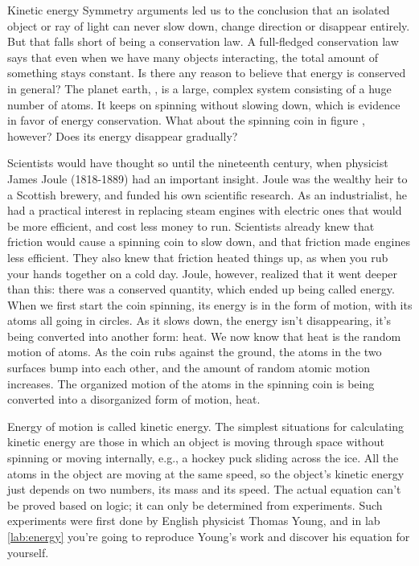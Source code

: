 \begin{envsubsection}{Kinetic energy}
Symmetry arguments led us to the conclusion that an isolated object or ray of light can never
slow down, change direction or disappear entirely. But that falls short of being a conservation
law. A full-fledged conservation law says that even when we have many objects interacting, the
total amount of something stays constant. Is there any reason to believe that energy is conserved
in general? The planet earth, , is a large, complex system consisting of a huge
number of atoms. It keeps on spinning without slowing down, which is evidence in favor of
energy conservation. What about the spinning coin in figure , however? Does its
energy disappear gradually?

Scientists would have thought so until the nineteenth century, when physicist James
Joule (1818-1889) had an important insight. Joule was the wealthy heir to a Scottish brewery, and funded his
own scientific research. As an industrialist, he had a practical interest in replacing steam engines
with electric ones that would be more efficient, and cost less money to run. Scientists already
knew that friction would cause a spinning coin to slow down, and that friction made engines less
efficient. They also knew that friction heated things up, as when you rub your hands together on
a cold day. Joule, however, realized that it went deeper than this: there was a conserved quantity,
which ended up being called energy. When we first start the coin spinning, its energy is in the
form of motion, with its atoms all going in circles. As it slows down, the energy isn't
disappearing, it's being converted into another form: heat. We now know that
heat is the random motion of atoms. As the coin rubs against the ground, the atoms in the
two surfaces bump into each other, and the amount of random atomic motion increases.
The organized motion of the atoms in the spinning coin is being converted into a disorganized
form of motion, heat.

Energy of motion is called kinetic energy.
The simplest situations for calculating kinetic energy are those in which an object is moving
through space without spinning or moving internally, e.g., a hockey puck sliding across the
ice. All the atoms in the object are moving at the same speed, so the object's kinetic energy
just depends on two numbers, its mass and its speed. The actual equation can't be proved based
on logic; it can only be determined from experiments. Such experiments were first done
by English physicist Thomas Young, and in lab \thechapter\ref{lab:energy} you're going to reproduce Young's work and
discover his equation for yourself.



\end{envsubsection}
